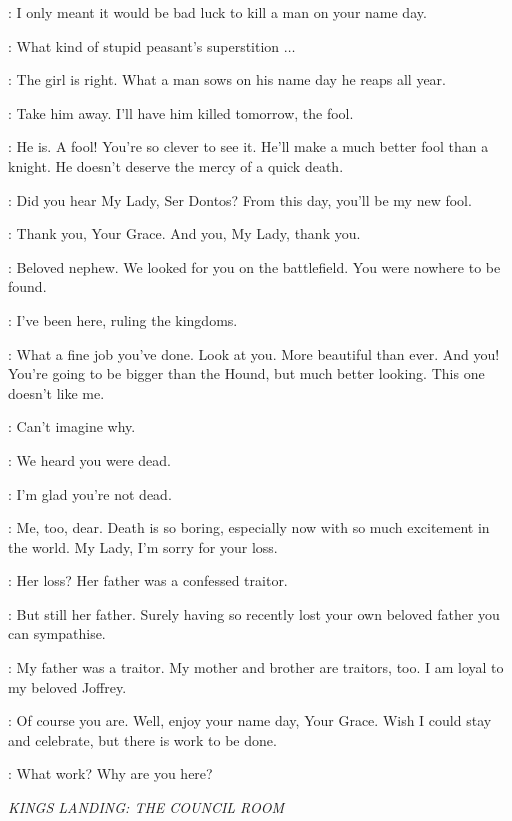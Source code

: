 \SANSA: I only meant it would be bad luck to kill a man on your name day.

\JOFFREY: What kind of stupid peasant's superstition $\ldots$

\HOUND: The girl is right. What a man sows on his name day he reaps all year.

\JOFFREY: Take him away. I'll have him killed tomorrow, the fool.

\SANSA: He is. A fool! You're so clever to see it. He'll make a much better fool than a knight. He doesn't deserve the mercy of a quick death.

\JOFFREY: Did you hear My Lady, Ser Dontos? From this day, you'll be my new fool.

\DONTOS: Thank you, Your Grace. And you, My Lady, thank you.


\TYRION: Beloved nephew. We looked for you on the battlefield. You were nowhere to be found.

\JOFFREY: I've been here, ruling the kingdoms.

\TYRION: What a fine job you've done.  Look at you. More beautiful than ever.  And you! You're going to be bigger than the Hound, but much better looking.  This one doesn't like me.

\BRONN: Can't imagine why.

\JOFFREY: We heard you were dead.

\MYRCELLA: I'm glad you're not dead.

\TYRION: Me, too, dear. Death is so boring, especially now with so much excitement in the world.  My Lady, I'm sorry for your loss.

\JOFFREY: Her loss? Her father was a confessed traitor.

\TYRION: But still her father. Surely having so recently lost your own beloved father you can sympathise.

\SANSA: My father was a traitor. My mother and brother are traitors, too. I am loyal to my beloved Joffrey.

\TYRION: Of course you are. Well, enjoy your name day, Your Grace. Wish I could stay and celebrate, but there is work to be done.

\JOFFREY: What work? Why are you here?


\scene

\textit{KINGS LANDING: THE COUNCIL ROOM}

